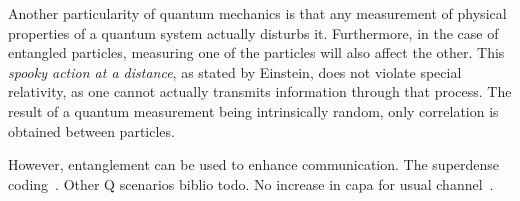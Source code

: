 Another particularity of quantum mechanics is that any measurement of physical properties of a quantum system actually disturbs it. Furthermore, in the case of entangled particles, measuring one of the particles will also affect the other. This \emph{spooky action at a distance}, as stated by Einstein, does not violate special relativity, as one cannot actually transmits information through that process. The result of a quantum measurement being intrinsically random, only correlation is obtained between particles.

However, entanglement can be used to enhance communication. The superdense coding~\cite{BW92}. Other Q scenarios biblio todo. No increase in capa for usual channel~\cite{BSST99}. 





